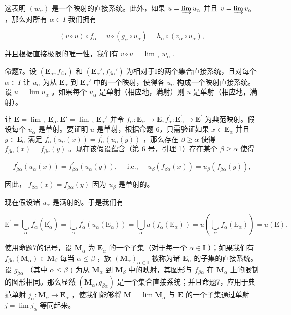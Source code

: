 这表明 \((w_{\alpha})\) 是一个映射的直接系统。此外，如果 \(u = \varinjlim u_{\alpha}\) 并且 \(v = \varinjlim v_{\alpha}\) ，那么对所有 \(\alpha \in I\) 我们拥有

\[
(v \circ u) \circ f _ {\alpha} = v \circ (g _ {\alpha} \circ u _ {\alpha}) = h _ {\alpha} \circ (v _ {\alpha} \circ u _ {\alpha}),
\]

并且根据直接极限的唯一性，我们有 \(v \circ u = \lim_{\rightarrow} w_{\alpha}\) .

命题7。设 \((\mathbf{E}_{\alpha}, f_{\beta \alpha})\) 和 \((\mathbf{E}_{\alpha}', f_{\beta \alpha}')\) 为相对于I的两个集合直接系统，且对每个 \(\alpha \in I\) 让 \(u_{\alpha}\) 为从 \(\mathbf{E}_{\alpha}\) 到 \(\mathbf{E}_{\alpha}'\) 中的一个映射，使得各 \(u_{\alpha}\) 构成一个映射直接系统。设 \(u = \lim u_{\alpha}\) 。如果每个 \(u_{\alpha}\) 是单射（相应地，满射）则 \(u\) 是单射（相应地，满射）。

让 \(\mathbf{E} = \lim_{\rightarrow}\mathbf{E}_{\alpha},\mathbf{E}' = \lim_{\rightarrow}\mathbf{E}_{\alpha}'\) 并令 \(f_{\alpha}\colon \mathbf{E}_{\alpha}\to \mathbf{E},f_{\alpha}^{\prime}\colon \mathbf{E}_{\alpha}^{\prime}\to \mathbf{E}^{\prime}\) 为典范映射。假设每个 \(u_{\alpha}\) 是单射。要证明 \(u\) 是单射，根据命题 6，只需验证如果 \(x\in \mathbf{E}_{\alpha}\) 并且 \(y\in \mathbf{E}_{\alpha}\) 满足 \(f_{\alpha}^{\prime}(u_{\alpha}(x)) = f_{\alpha}^{\prime}(u_{\alpha}(y))\) ，那么存在 \(\beta \geqslant \alpha\) 使得 \(f_{\beta \alpha}(x) = f_{\beta \alpha}(y)\) 。现在该假设蕴含（第 6 号，引理 1）存在某个 \(\beta \geqslant \alpha\) 使得

\[
f _ {\beta \alpha} ^ {\prime} (u _ {\alpha} (x)) = f _ {\beta \alpha} ^ {\prime} (u _ {\alpha} (y)), \quad \text { i.e., } \quad u _ {\beta} (f _ {\beta \alpha} (x)) = u _ {\beta} (f _ {\beta \alpha} (y)),
\]

因此， \(f_{\beta \alpha}(x) = f_{\beta \alpha}(y)\) 因为 \(u_{\beta}\) 是单射的。

现在假设诸 \(u_{\alpha}\) 是满射的。于是我们有

\[
\mathrm{E} ^ {\prime} = \bigcup_ {\alpha} f _ {\alpha} ^ {\prime} (\mathrm{E} _ {\alpha} ^ {\prime}) = \bigcup_ {\alpha} f _ {\alpha} ^ {\prime} (u _ {\alpha} (\mathrm{E} _ {\alpha})) = \bigcup_ {\alpha} u (f _ {\alpha} (\mathrm{E} _ {\alpha})) = u \left(\bigcup_ {\alpha} f _ {\alpha} (\mathrm{E} _ {\alpha})\right) = u (\mathrm{E}).
\]

使用命题7的记号，设 \(\mathbf{M}_{\alpha}\) 为 \(\mathbf{E}_{\alpha}\) 的一个子集（对于每一个 \(\alpha \in \mathbf{I}\) ）；如果我们有 \(f_{\beta \alpha}(\mathbf{M}_{\alpha}) \in \mathbf{M}_{\beta}\) 每当 \(\alpha \leqslant \beta\) ，族 \((\mathbf{M}_{\alpha})_{\alpha \in \mathbf{I}}\) 被称为诸 \(\mathbf{E}_{\alpha}\) 的子集的直接系统。设 \(g_{\beta \alpha}\) （其中 \(\alpha \leqslant \beta\) ) 为从 \(\mathbf{M}_{\alpha}\) 到 \(\mathbf{M}_{\beta}\) 中的映射，其图形与 \(f_{\beta \alpha}\) 在 \(\mathbf{M}_{\alpha}\) 上的限制的图形相同。那么显然 \((\mathbf{M}_{\alpha}, g_{\beta \alpha})\) 是一个集合直接系统；并且命题7，应用于典范单射 \(j_{\alpha}: \mathbf{M}_{\alpha} \to \mathbf{E}_{\alpha}\) ，使我们能够将 \(\mathbf{M} = \lim \mathbf{M}_{\alpha}\) 与 \(\mathbf{E}\) 的一个子集通过单射 \(j = \lim j_{\alpha}\) 等同起来。

